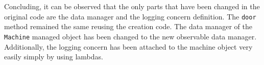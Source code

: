 






Concluding, it can be observed that the only parts that have been changed in the original code are the data manager and the logging concern definition.
The \texttt{door} method remained the same reusing the creation code.
The data manager of the \texttt{Machine} managed object has been changed to the new observable data manager.
Additionally, the logging concern has been attached to the machine object very easily simply by using lambdas.

